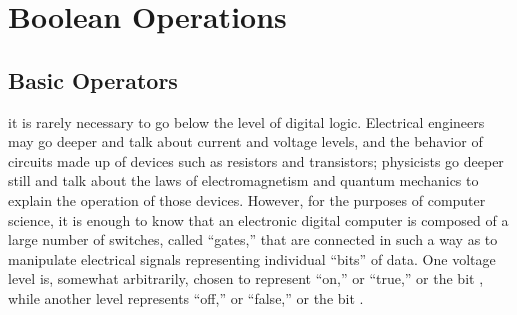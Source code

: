 
\section{Boolean Operations}
\subsection{Basic Operators}\label{basicop}
 it is rarely necessary to go below the level of digital logic. Electrical engineers may go deeper and talk about current and voltage levels, and the behavior of circuits made up of devices such as resistors and transistors; physicists go deeper still and talk about the laws of electromagnetism and quantum mechanics to explain the operation of those devices. However, for the purposes of computer science, it is enough to know that an electronic digital computer is composed of a large number of switches, called ``gates,'' that are connected in such a way as to manipulate electrical signals representing individual ``bits'' of data. One voltage level is, somewhat arbitrarily, chosen to represent ``on,'' or ``true,'' or the bit \1, while another level represents ``off,'' or ``false,'' or the bit \0.

